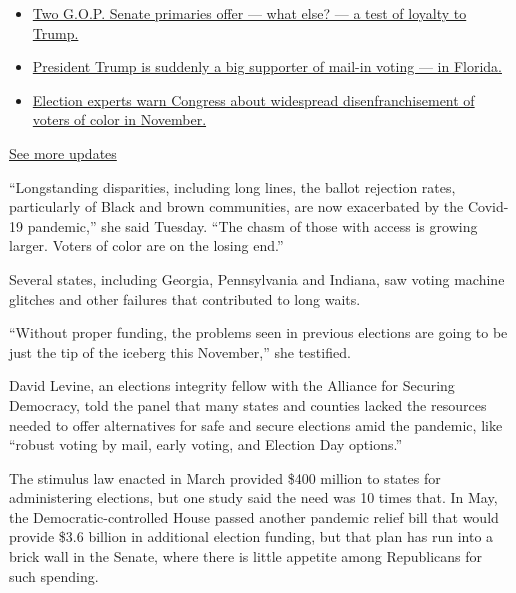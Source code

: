 \begin{itemize}
\tightlist
\item
  \href{https://www.nytimes3xbfgragh.onion/2020/08/04/us/elections/primary-election-michigan-arizona-kansas.html?action=click\&pgtype=Article\&state=default\&region=MAIN_CONTENT_1\&context=storylines_live_updates\#link-3924dd44}{Two
  G.O.P. Senate primaries offer --- what else? --- a test of loyalty to
  Trump.}
\item
  \href{https://www.nytimes3xbfgragh.onion/2020/08/04/us/elections/primary-election-michigan-arizona-kansas.html?action=click\&pgtype=Article\&state=default\&region=MAIN_CONTENT_1\&context=storylines_live_updates\#link-32b39e33}{President
  Trump is suddenly a big supporter of mail-in voting --- in Florida.}
\item
  \href{https://www.nytimes3xbfgragh.onion/2020/08/04/us/elections/primary-election-michigan-arizona-kansas.html?action=click\&pgtype=Article\&state=default\&region=MAIN_CONTENT_1\&context=storylines_live_updates\#link-6d019753}{Election
  experts warn Congress about widespread disenfranchisement of voters of
  color in November.}
\end{itemize}

\href{https://www.nytimes3xbfgragh.onion/2020/08/04/us/elections/primary-election-michigan-arizona-kansas.html?action=click\&pgtype=Article\&state=default\&region=MAIN_CONTENT_1\&context=storylines_live_updates}{See
more updates}

``Longstanding disparities, including long lines, the ballot rejection
rates, particularly of Black and brown communities, are now exacerbated
by the Covid-19 pandemic,'' she said Tuesday. ``The chasm of those with
access is growing larger. Voters of color are on the losing end.''

Several states, including Georgia, Pennsylvania and Indiana, saw voting
machine glitches and other failures that contributed to long waits.

``Without proper funding, the problems seen in previous elections are
going to be just the tip of the iceberg this November,'' she testified.

David Levine, an elections integrity fellow with the Alliance for
Securing Democracy, told the panel that many states and counties lacked
the resources needed to offer alternatives for safe and secure elections
amid the pandemic, like ``robust voting by mail, early voting, and
Election Day options.''

The stimulus law enacted in March provided \$400 million to states for
administering elections, but one study said the need was 10 times that.
In May, the Democratic-controlled House passed another pandemic relief
bill that would provide \$3.6 billion in additional election funding,
but that plan has run into a brick wall in the Senate, where there is
little appetite among Republicans for such spending.

